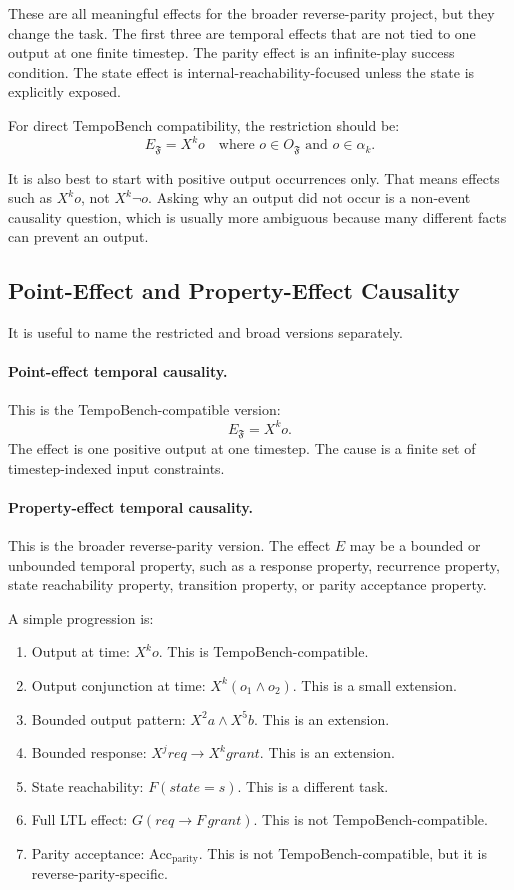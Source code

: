 \documentclass[11pt]{article}
\theoremstyle{remark}
\newcommand{\Frame}{\mathfrak{F}}
\begin{document}
These are all meaningful effects for the broader reverse-parity project, but
they change the task. The first three are temporal effects that are not tied to
one output at one finite timestep. The parity effect is an infinite-play success
condition. The state effect is internal-reachability-focused unless the state is
explicitly exposed.

For direct TempoBench compatibility, the restriction should be:
\[
\boxed{
  E_{\Frame} = X^k o
  \quad\text{where } o\in O_{\Frame}
  \text{ and } o\in\alpha_k.
}
\]

It is also best to start with positive output occurrences only. That means
effects such as \(X^k o\), not \(X^k\neg o\). Asking why an output did not occur
is a non-event causality question, which is usually more ambiguous because many
different facts can prevent an output.

\subsection{Point-Effect and Property-Effect Causality}

It is useful to name the restricted and broad versions separately.

\paragraph{Point-effect temporal causality.}
This is the TempoBench-compatible version:
\[
  E_{\Frame}=X^k o.
\]
The effect is one positive output at one timestep. The cause is a finite set of
timestep-indexed input constraints.

\paragraph{Property-effect temporal causality.}
This is the broader reverse-parity version. The effect \(E\) may be a bounded
or unbounded temporal property, such as a response property, recurrence
property, state reachability property, transition property, or parity acceptance
property.

A simple progression is:
\begin{enumerate}[label=\arabic*.]
  \item Output at time: \(X^k o\). This is TempoBench-compatible.
  \item Output conjunction at time: \(X^k(o_1\land o_2)\). This is a small
        extension.
  \item Bounded output pattern: \(X^2 a\land X^5 b\). This is an extension.
  \item Bounded response: \(X^j req\rightarrow X^k grant\). This is an
        extension.
  \item State reachability: \(F(state=s)\). This is a different task.
  \item Full LTL effect: \(G(req\rightarrow F\,grant)\). This is not
        TempoBench-compatible.
  \item Parity acceptance: \(\mathrm{Acc}_{\mathrm{parity}}\). This is not
        TempoBench-compatible, but it is reverse-parity-specific.
\end{enumerate}
\end{document}
